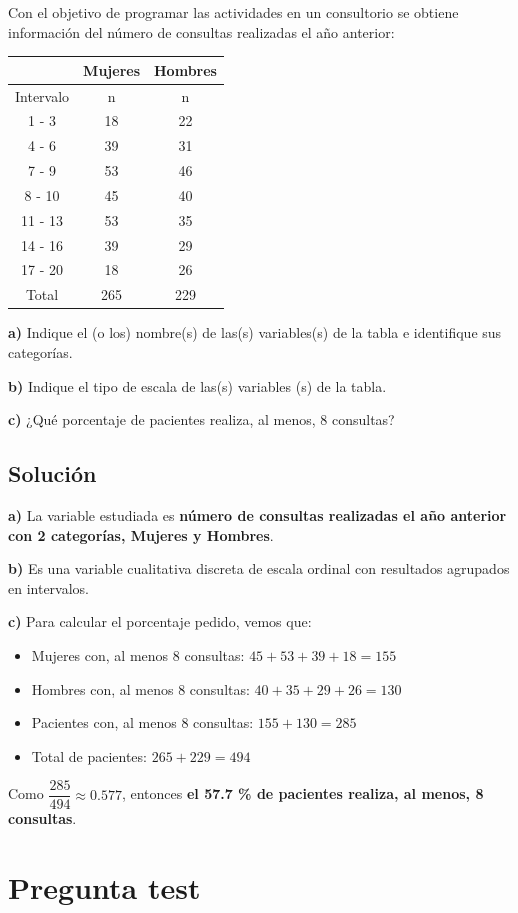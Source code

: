 \documentclass[
]{book}
\begin{document}
Con el objetivo de programar las actividades en un consultorio se obtiene información del número de consultas realizadas el año anterior:

\begin{longtable}[]{@{}ccc@{}}
\toprule
& Mujeres & Hombres\tabularnewline
\midrule
\endhead
Intervalo & n & n\tabularnewline
1 - 3 & 18 & 22\tabularnewline
4 - 6 & 39 & 31\tabularnewline
7 - 9 & 53 & 46\tabularnewline
8 - 10 & 45 & 40\tabularnewline
11 - 13 & 53 & 35\tabularnewline
14 - 16 & 39 & 29\tabularnewline
17 - 20 & 18 & 26\tabularnewline
Total & 265 & 229\tabularnewline
\bottomrule
\end{longtable}

\textbf{a)} Indique el (o los) nombre(s) de las(s) variables(s) de la tabla e identifique sus categorías.

\textbf{b)} Indique el tipo de escala de las(s) variables (s) de la tabla.

\textbf{c)} ¿Qué porcentaje de pacientes realiza, al menos, 8 consultas?

\hypertarget{soluciuxf3n-3}{%
\subsection{Solución}\label{soluciuxf3n-3}}

\textbf{a)} La variable estudiada es \textbf{número de consultas realizadas el año anterior con 2 categorías, Mujeres y Hombres}.

\textbf{b)} Es una variable cualitativa discreta de escala ordinal con resultados agrupados en intervalos.

\textbf{c)} Para calcular el porcentaje pedido, vemos que:

\begin{itemize}
\item
  Mujeres con, al menos 8 consultas: \(45 + 53 + 39 + 18 = 155\)
\item
  Hombres con, al menos 8 consultas: \(40 + 35 + 29 + 26 = 130\)
\item
  Pacientes con, al menos 8 consultas: \(155 + 130 = 285\)
\item
  Total de pacientes: \(265 + 229 = 494\)
\end{itemize}

Como \(\dfrac{285}{494} \approx 0.577\), entonces \textbf{el 57.7 \% de pacientes realiza, al menos, 8 consultas}.

\hypertarget{pregunta-test-17}{%
\section{Pregunta test}\label{pregunta-test-17}}
\end{document}
